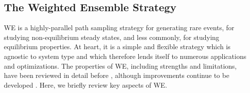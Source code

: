 \begin{comment}
The rules for resampling trajectories without bias are extremely flexible \citep{Zhang2010} and numerous possibilities are implemented within the WESTPA software. 
Typically, WE simulations rely on “bins,” which are defined regions of configuration space for which the user defines a target number of trajectories \citep{HuberKim1996}. 
In WESTPA, bins can be constructed from simple one or two-dimensional “progress coordinates”, a hierarchical nesting of bins inside of other bins, Voronoi cells, or the WExplore hierarchical Voronoi strategy \citep{Zwier2015,Dickson2014}.
Strictly speaking, it is worth noting that bins are not required to perform WE-like resampling \citep{Dickson2018or19}.

Each WE simulation ultimately yields an ensemble of trajectories, from which different types of information can be extracted. 
Each trajectory which makes a full transition between states of interest, say from A to B, yields an ordered set of configurations which can be analyzed for structural changes and for the sequence of events. 
The full weighted ensemble of trajectories, if clustered into pathway groups, can provide information on the relative importance of different pathways \citep{Ernesto2019}. 
If WE was performed with a “recycling” condition where trajectories reaching B are fed back to A, then the rate constant for the process can be estimated from the probability flux arriving to state B if the simulation achieves steady state and hence constant flux \citep{Divesh2010,ZuckermanChong2017}.
If a WE simulation does not achieve steady state, it is still possible in principle to estimate rate constants using a non-Markovian analysis, also called a history-augmented Markov State Model \cite{Ernesto2014,Upendra2019,Jeremy2019}.
\end{comment}



\subsection{The Weighted Ensemble Strategy}

WE is a highly-parallel path sampling strategy for generating rare events, for studying non-equilibrium steady states, and less commonly, for studying equilibrium properties. 
At heart, it is a simple and flexible strategy which is agnostic to system type and which therefore lends itself to numerous applications and optimizations. 
The properties of WE, including strengths and limitations, have been reviewed in detail before \citep{zuckerman_weighted_2017}, although improvements continue to be developed \citep{donyapour_revo_2019, copperman_accelerated_2020, torrillo_minimal_2021, degrave_red_2021, aristoff_optimizing_2020}. 
Here, we briefly review key aspects of WE.

